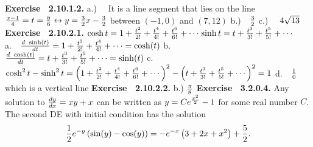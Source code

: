  {\noindent \protect \bf  Exercise ~2.10.1.2.} a.)~~ It is a line segment that lies on the line $\protect \frac  {x-1}{4} = t = \protect \frac  {y}{6} \leftrightarrow y = \protect \frac  {3}{2} x - \protect \frac  {3}{2} $ between $(-1,0)$ and $(7,12)$ \protect \newline  b.)~~$\protect \frac  {3}{2}$ \protect \newline  c.)~~ $4\protect \sqrt  {13}$ \protect \newline  \protect \newline  
 {\noindent \protect \bf  Exercise ~2.10.2.1.} $\protect \qopname  \relax o{cosh}{t} = 1+\protect \frac  {t^2}{2!} + \protect \frac  {t^4}{4!}+\protect \frac  {t^6}{6!} + \protect \cdots  $\protect \newline  $\protect \qopname  \relax o{sinh}{t} = t + \protect \frac  {t^3}{3!} + \protect \frac  {t^5}{5!}+ \protect \cdots  $ \protect \newline  a.~~$\protect \frac  {d ~\protect \qopname  \relax o{sinh}(t)}{dt} = 1+\protect \frac  {t^2}{2!}+\protect \frac  {t^4}{4!} + \protect \cdots  =\protect \qopname  \relax o{cosh}(t)$ \protect \newline  b.~~$\protect \frac  {d ~\protect \qopname  \relax o{cosh}(t)}{dt} = t+\protect \frac  {t^3}{3!}+\protect \frac  {t^5}{5!} + \protect \cdots  =\protect \qopname  \relax o{sinh}(t)$ \protect \newline  c.~~$ \protect \qopname  \relax o{cosh}^2{t}- \protect \qopname  \relax o{sinh}^2{t} = \left (1+\protect \frac  {t^2}{2!} + \protect \frac  {t^4}{4!}+\protect \frac  {t^6}{6!} + \protect \cdots  \right )^2 - \left (t + \protect \frac  {t^3}{3!} + \protect \frac  {t^5}{5!}+ \protect \cdots  \right )^2 = 1 $ \protect \newline  d.~~$\protect \frac  {1}{0}$ which is a vertical line \protect \newline  \protect \newline  
 {\noindent \protect \bf  Exercise ~2.10.2.2.}  b.) $\protect \frac  {\pi }{8}$\protect \newline   \protect \newline  \protect \newline  
 {\noindent \protect \bf  Exercise ~3.2.0.4.} Any solution to $\protect \frac  {dy}{dx}=xy+x$ can be written as $y=Ce^{\protect \frac  {x^2}{2}}-1$ for some real number $C$. The second DE with initial condition has the solution $$\protect \frac  {1}{2}e^{-y}\left (\protect \qopname  \relax o{sin}(y)-\protect \qopname  \relax o{cos}(y)\right )=-e^{-x}\left (3+2x+x^2\right )+\protect \frac  {5}{2}. $$ \protect \newline  \protect \newline  
